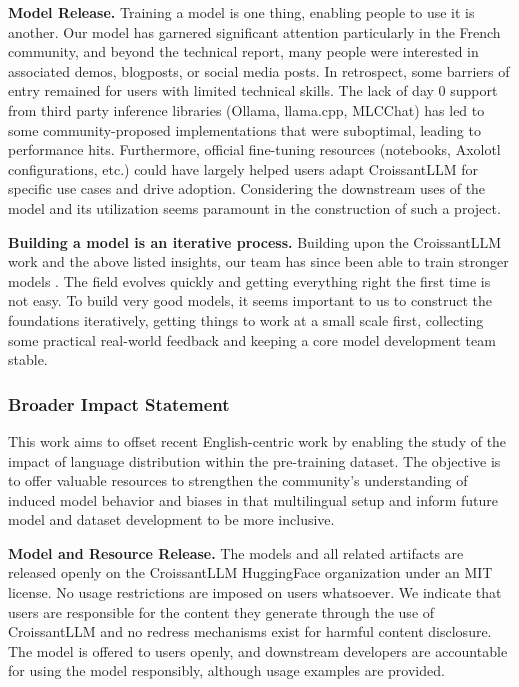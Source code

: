 \noindent\textbf{Model Release.} Training a model is one thing, enabling people to use it is another. Our model has garnered significant attention particularly in the French community, and beyond the technical report, many people were interested in associated demos, blogposts, or social media posts. In retrospect, some barriers of entry remained for users with limited technical skills. The lack of day 0 support from third party inference libraries (Ollama, llama.cpp, MLCChat) has led to some community-proposed implementations that were suboptimal, leading to performance hits. Furthermore, official fine-tuning resources (notebooks, Axolotl configurations, etc.) could have largely helped users adapt CroissantLLM for specific use cases and drive adoption. Considering the downstream uses of the model and its utilization seems paramount in the construction of such a project.


\noindent\textbf{Building a model is an iterative process.} Building upon the CroissantLLM work and the above listed insights, our team has since been able to train stronger models . The field evolves quickly and getting everything right the first time is not easy. To build very good models, it seems important to us to construct the foundations iteratively, getting things to work at a small scale first, collecting some practical real-world feedback and keeping a core model development team stable.



\subsubsection*{Broader Impact Statement}

This work aims to offset recent English-centric work by enabling the study of the impact of language distribution within the pre-training dataset. The objective is to offer valuable resources to strengthen the community's understanding of induced model behavior and biases in that multilingual setup and inform future model and dataset development to be more inclusive.

\textbf{Model and Resource Release.}
The models and all related artifacts are released openly on the CroissantLLM HuggingFace organization under an MIT license. No usage restrictions are imposed on users whatsoever.  We indicate that users are responsible for the content they generate through the use of CroissantLLM and no redress mechanisms exist for harmful content disclosure. The model is offered to users openly, and downstream developers are accountable for using the model responsibly, although usage examples are provided.

